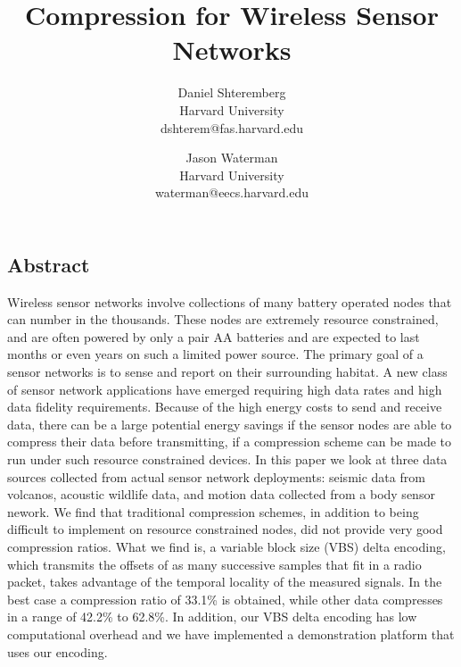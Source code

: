 \documentclass{article}
\date{}
\begin{document}

\title{\ttlfnt Compression for Wireless Sensor Networks}

\author{{\aufnt Daniel Shteremberg} \\ 
{\affaddr Harvard University}\\ 
{\affaddr dshterem@fas.harvard.edu}
\and {\aufnt Jason Waterman} \\
{\affaddr Harvard University}\\ 
{\affaddr waterman@eecs.harvard.edu}
}

\maketitle
\thispagestyle{empty}


\subsection*{Abstract}
\begin{small}
Wireless sensor networks involve collections of many battery operated
nodes that can number in the thousands.  These nodes are extremely
resource constrained, and are often powered by only a pair AA
batteries and are expected to last months or even years on such a
limited power source.  The primary goal of a sensor networks is to
sense and report on their surrounding habitat.  A new class of sensor
network applications have emerged requiring high data rates and high
data fidelity requirements.  Because of the high energy costs to send
and receive data, there can be a large potential energy savings if the
sensor nodes are able to compress their data before transmitting, if a
compression scheme can be made to run under such resource constrained
devices.  In this paper we look at three data sources collected from
actual sensor network deployments: seismic data from volcanos,
acoustic wildlife data, and motion data collected from a body sensor
nework.  We find that traditional compression schemes, in addition to
being difficult to implement on resource constrained nodes, did not
provide very good compression ratios.  What we find is, a variable
block size (VBS) delta encoding, which transmits the offsets of as
many successive samples that fit in a radio packet, takes advantage of
the temporal locality of the measured signals.  In the best case a
compression ratio of 33.1\% is obtained, while other data compresses
in a range of 42.2\% to 62.8\%.  In addition, our VBS delta encoding
has low computational overhead and we have implemented a demonstration
platform that uses our encoding.
\end{small}
\end{document}
